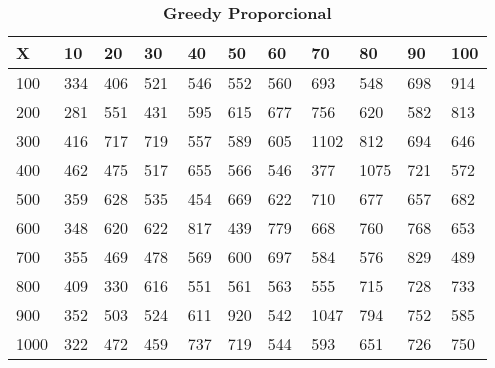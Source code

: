 \documentclass[10pt,letterpaper]{article}
\begin{document}
\begin{center}
\begin{table}\renewcommand{\arraystretch}{2.5}
\caption{\large \textbf{Greedy Proporcional}}
\centering
\begin{tabular} { |m{0.5cm}|m{1.3cm}|m{1.3cm}|m{1.3cm}|m{1.3cm}|m{1.3cm}|m{1.3cm}|m{1.3cm}|m{1.3cm}|m{1.3cm}|m{1.3cm}|} 
\hline
\rowcolor{Gray}
\centering \textbf{X} & \centering \textbf{10} & \centering \textbf{20} & \centering \textbf{30}\ & \centering \textbf{40} & \centering \textbf{50} & \centering \textbf{60}\ & \centering \textbf{70} & \centering \textbf{80} & \centering \textbf{90}\ & \textbf{100} \\\hline
\cellcolor{Gray}100 & \Large 334 & \Large 406 & \Large 521 & \Large 546 & \Large 552 & \Large 560 & \Large 693 & \Large 548 & \Large 698 & \Large 914 \\
\hline
\cellcolor{Gray}200 & \Large 281 & \Large 551 & \Large 431 & \Large 595 & \Large 615 & \Large 677 & \Large 756 & \Large 620 & \Large 582 & \Large 813 \\
\hline
\cellcolor{Gray}300 & \Large 416 & \Large 717 & \Large 719 & \Large 557 & \Large 589 & \Large 605 & \Large 1102 & \Large 812 & \Large 694 & \Large 646 \\
\hline
\cellcolor{Gray}400 & \Large 462 & \Large 475 & \Large 517 & \Large 655 & \Large 566 & \Large 546 & \Large 377 & \Large 1075 & \Large 721 & \Large 572 \\
\hline
\cellcolor{Gray}500 & \Large 359 & \Large 628 & \Large 535 & \Large 454 & \Large 669 & \Large 622 & \Large 710 & \Large 677 & \Large 657 & \Large 682 \\
\hline
\cellcolor{Gray}600 & \Large 348 & \Large 620 & \Large 622 & \Large 817 & \Large 439 & \Large 779 & \Large 668 & \Large 760 & \Large 768 & \Large 653 \\
\hline
\cellcolor{Gray}700 & \Large 355 & \Large 469 & \Large 478 & \Large 569 & \Large 600 & \Large 697 & \Large 584 & \Large 576 & \Large 829 & \Large 489 \\
\hline
\cellcolor{Gray}800 & \Large 409 & \Large 330 & \Large 616 & \Large 551 & \Large 561 & \Large 563 & \Large 555 & \Large 715 & \Large 728 & \Large 733 \\
\hline
\cellcolor{Gray}900 & \Large 352 & \Large 503 & \Large 524 & \Large 611 & \Large 920 & \Large 542 & \Large 1047 & \Large 794 & \Large 752 & \Large 585 \\
\hline
\cellcolor{Gray}1000 & \Large 322 & \Large 472 & \Large 459 & \Large 737 & \Large 719 & \Large 544 & \Large 593 & \Large 651 & \Large 726 & \Large 750 \\
\hline
\end{tabular} \\
\end{table}
\end{center}
\end{document}
